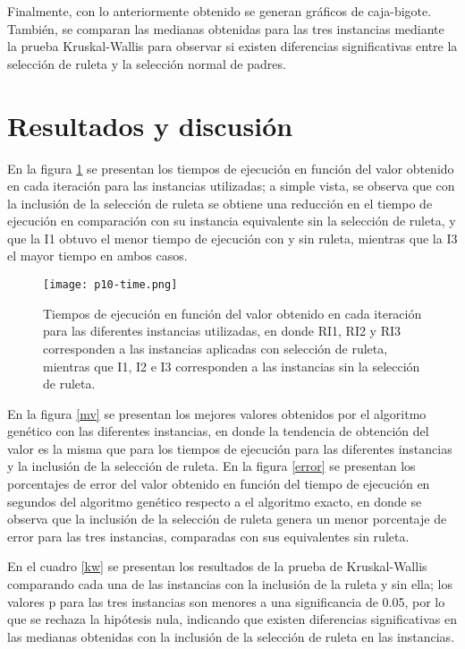 \documentclass{article}
\begin{document}
Finalmente, con lo anteriormente obtenido se generan gráficos de caja-bigote. También, se comparan las medianas obtenidas para las tres instancias mediante la prueba Kruskal-Wallis para observar si existen diferencias significativas entre la selección de ruleta y la selección normal de padres.

\section{Resultados y discusión}
En la figura \ref{time} se presentan los tiempos de ejecución en función del valor obtenido en cada iteración para las instancias utilizadas; a simple vista, se observa que con la inclusión de la selección de ruleta se obtiene una reducción en el tiempo de ejecución en comparación con su instancia equivalente sin la selección de ruleta, y que la I1 obtuvo el menor tiempo de ejecución con y sin ruleta, mientras que la I3 el mayor tiempo en ambos casos.

\begin{figure}[ptb]
\begin{center}
\texttt{[image: p10-time.png]}
\end{center}
\caption{Tiempos de ejecución en función del valor obtenido en cada iteración para las diferentes instancias utilizadas, en donde RI1, RI2 y RI3 corresponden a las instancias aplicadas con selección de ruleta, mientras que I1, I2 e I3 corresponden a las instancias sin la selección de ruleta.\label{time}}
\end{figure}

En la figura \ref{mv} se presentan los mejores valores obtenidos por el algoritmo genético con las diferentes instancias, en donde la tendencia de obtención del valor es la misma que para los tiempos de ejecución para las diferentes instancias y la inclusión de la selección de ruleta. En la figura \ref{error} se presentan los porcentajes de error del valor obtenido en función del tiempo de ejecución en segundos del algoritmo genético respecto a el algoritmo exacto, en donde se observa que la inclusión de la selección de ruleta genera un menor porcentaje de error para las tres instancias, comparadas con sus equivalentes sin ruleta. 

En el cuadro \ref{kw} se presentan los resultados de la prueba de Kruskal-Wallis comparando cada una de las instancias con la inclusión de la ruleta y sin ella; los valores p para las tres instancias son menores a una significancia de 0.05, por lo que se rechaza la hipótesis nula, indicando que existen diferencias significativas en las medianas obtenidas con la inclusión de la selección de ruleta en las instancias.
\end{document}
